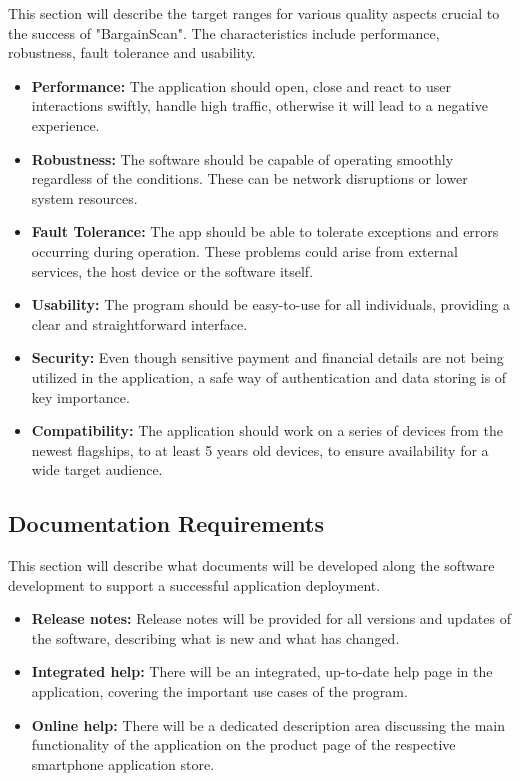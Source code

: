 This section will describe the target ranges for various quality aspects crucial to the success of "BargainScan". The characteristics include performance, robustness, fault tolerance and usability.

\begin{itemize}
	\item \textbf{Performance:} The application should open, close and react to user interactions swiftly, handle high traffic, otherwise it will lead to a negative experience.
	\item \textbf{Robustness:} The software should be capable of operating smoothly regardless of the conditions. These can be network disruptions or lower system resources.
	\item \textbf{Fault Tolerance:} The app should be able to tolerate exceptions and errors occurring during operation. These problems could arise from external services, the host device or the software itself.
	\item \textbf{Usability:} The program should be easy-to-use for all individuals, providing a clear and straightforward interface.
	\item \textbf{Security:} Even though sensitive payment and financial details are not being utilized in the application, a safe way of authentication and data storing is of key importance.
	\item \textbf{Compatibility:} The application should work on a series of devices from the newest flagships, to at least 5 years old devices, to ensure availability for a wide target audience.
\end{itemize}


\subsection{Documentation Requirements}

This section will describe what documents will be developed along the software development to support a successful application deployment.

\begin{itemize}
	\item \textbf{Release notes:} Release notes will be provided for all versions and updates of the software, describing what is new and what has changed.
	\item \textbf{Integrated help:} There will be an integrated, up-to-date help page in the application, covering the important use cases of the program.
	\item \textbf{Online help:} There will be a dedicated description area discussing the main functionality of the application on the product page of the respective smartphone application store.
\end{itemize}
